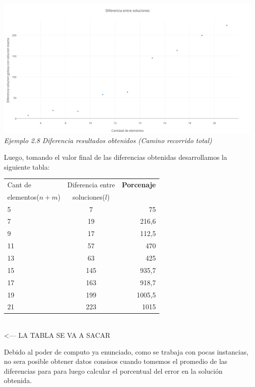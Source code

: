 \vspace*{0.3cm} \vspace*{0.3cm}
  \begin{center}
\includegraphics[scale=0.5]{./EJ2/Diferenciagym0.png}
\\{\textit{Ejemplo 2.8 Diferencia resultados obtenidos (Camino recorrido total) }}
  \end{center}
  \vspace*{0.3cm}

Luego, tomando el valor final de las diferencias obtenidas desarrollamos la siguiente tabla:

   \begin{tabular}{ | l | c | r |}
   \hline
	Cant de & Diferencia entre  & \textbf{Porcenaje}  \\ 
elementos($n+m$) & soluciones($l$) &  \\ \hline
5 &	7 &	75 \\ \hline
7 &	19 & 216,6 \\ \hline
9 &	17 & 112,5 \\ \hline 
11 & 57 & 470 \\ \hline
13 & 63 & 425 \\ \hline
15 & 145 & 935,7 \\ \hline
17 & 163 & 918,7 \\ \hline
19 & 199 & 1005,5 \\ \hline
21 & 223 & 1015 \\ 
\hline
   \end{tabular}\\

<--- LA TABLA SE VA A SACAR

Debido al poder de computo ya enunciado, como se trabaja con pocas instancias, no sera posible obtener datos consisos cuando tomemos el promedio de las diferencias para para luego calcular el porcentual del error en la soluci\'on obtenida.

